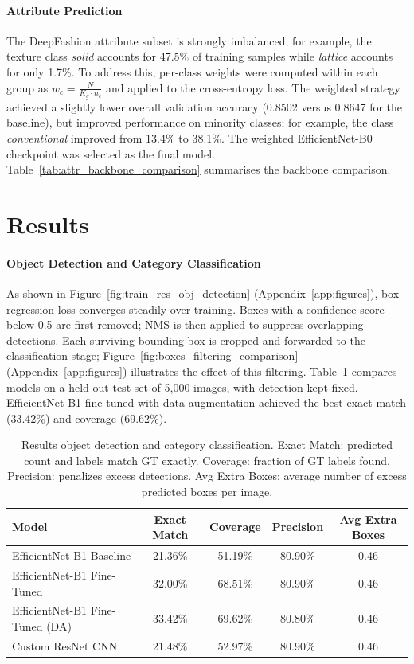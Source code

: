 \documentclass{article}
\begin{document}
\paragraph{Attribute Prediction}
The DeepFashion attribute subset is strongly imbalanced; for example, the texture class \emph{solid} accounts for 47.5\% of training samples while \emph{lattice} accounts for only 1.7\%. To address this, per-class weights were computed within each group as $w_c = \frac{N}{K_g \cdot n_c}$ and applied to the cross-entropy loss. The weighted strategy achieved a slightly lower overall validation accuracy (0.8502 versus 0.8647 for the baseline), but improved performance on minority classes; for example, the class \emph{conventional} improved from 13.4\% to 38.1\%. The weighted EfficientNet-B0 checkpoint was selected as the final model. Table~\ref{tab:attr_backbone_comparison} summarises the backbone comparison.



\section{Results}

\paragraph{Object Detection and Category Classification}
As shown in Figure~\ref{fig:train_res_obj_detection} (Appendix~\ref{app:figures}), box regression loss converges steadily over training. Boxes with a confidence score below 0.5 are first removed; NMS is then applied to suppress overlapping detections. Each surviving bounding box is cropped and forwarded to the classification stage; Figure~\ref{fig:boxes_filtering_comparison} (Appendix~\ref{app:figures}) illustrates the effect of this filtering. Table~\ref{tab:pipeline_eval} compares models on a held-out test set of 5{,}000 images, with detection kept fixed. EfficientNet-B1 fine-tuned with data augmentation achieved the best exact match (33.42\%) and coverage (69.62\%).

\begin{table}[h!]
\centering\small
\caption{Results object detection and category classification. Exact Match: predicted count and labels match GT exactly. Coverage: fraction of GT labels found. Precision: penalizes excess detections. Avg Extra Boxes: average number of excess predicted boxes per image.}
\label{tab:pipeline_eval}
\begin{tabular}{lcccc}
\toprule
Model & Exact Match & Coverage & Precision & Avg Extra Boxes \\
\midrule
EfficientNet-B1 Baseline        & 21.36\% & 51.19\% & 80.90\% & 0.46 \\
EfficientNet-B1 Fine-Tuned      & 32.00\% & 68.51\% & 80.90\% & 0.46 \\
EfficientNet-B1 Fine-Tuned (DA) & 33.42\% & 69.62\% & 80.80\% & 0.46 \\
Custom ResNet CNN               & 21.48\% & 52.97\% & 80.90\% & 0.46 \\
\bottomrule
\end{tabular}
\end{table}
\end{document}
